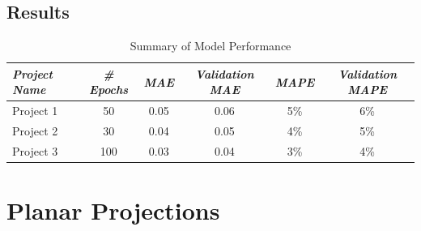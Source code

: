 \subsection{Results}
\begin{table}[ht]
    \centering
    \caption{Summary of Model Performance}
    \label{conic_results_table}
    \renewcommand{\arraystretch}{1.2} %
    \begin{tabular}{|l|c|c|c|c|c|}
        \hline
        \rowcolor[gray]{0.9}
        \textbf{\emph{Project Name}} & \textbf{\emph{\# Epochs}} & \textbf{\emph{MAE}} & \textbf{\emph{Validation MAE}} & \textbf{\emph{MAPE}} & \textbf{\emph{Validation MAPE}} \\ \hline
        Project 1                    & 50                        & 0.05                & 0.06                           & 5\%                  & 6\%                             \\ \hline
        Project 2                    & 30                        & 0.04                & 0.05                           & 4\%                  & 5\%                             \\ \hline
        Project 3                    & 100                       & 0.03                & 0.04                           & 3\%                  & 4\%                             \\ \hline
    \end{tabular}
\end{table}



\newpage
\section{Planar Projections}

